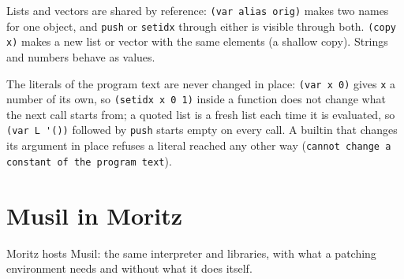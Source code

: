\documentclass[11pt,a4paper]{article}
\newcommand{\musil}[1]{\lstinline[style=musilinline]{#1}}
\begin{document}
Lists and vectors are shared by reference: \musil{(var alias orig)} makes two names
for one object, and \musil{push} or \musil{setidx} through either is visible through
both. \musil{(copy x)} makes a new list or vector with the same elements (a shallow
copy). Strings and numbers behave as values.

The literals of the program text are never changed in place: \musil{(var x 0)} gives
\musil{x} a number of its own, so \musil{(setidx x 0 1)} inside a function does not change
what the next call starts from; a quoted list is a fresh list each time it is evaluated, so
\musil{(var L '())} followed by \musil{push} starts empty on every call. A builtin that
changes its argument in place refuses a literal reached any other way
(\texttt{cannot change a constant of the program text}).

\section{Musil in Moritz}
\label{sec:moritz}

Moritz hosts Musil: the same interpreter and libraries, with what a patching environment
needs and without what it does itself.
\end{document}
